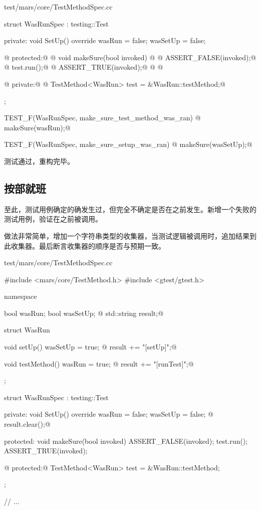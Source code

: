 \begin{content}
\begin{nodiff}{test/mars/core/TestMethodSpec.cc}
\begin{c++}
{  struct WasRunSpec : testing::Test {
  private:
    void SetUp() override {
      wasRun = false;
      wasSetUp = false;
    }

@  protected:@
@    void makeSure(bool invoked) {@
@      ASSERT_FALSE(invoked);@
@      test.run();@
@      ASSERT_TRUE(invoked);@      
@    }@

@  private:@
@    TestMethod<WasRun> test = &WasRun::testMethod;@
  };
}

TEST_F(WasRunSpec, make_sure_test_method_was_ran) {
@  makeSure(wasRun);@
}

TEST_F(WasRunSpec, make_sure_setup_was_ran) {
@  makeSure(wasSetUp);@
}
\end{c++}
\end{nodiff}

测试通过，重构完毕。

\subsection{按部就班}

至此，测试用例确定的确发生过，但完全不确定是否在之前发生。新增一个失败的测试用例，验证在之前被调用。

做法非常简单，增加一个字符串类型的收集器，当测试逻辑被调用时，追加结果到此收集器。最后断言收集器的顺序是否与预期一致。

\begin{nodiff}{test/mars/core/TestMethodSpec.cc}
\begin{c++}
#include <mars/core/TestMethod.h>
#include <gtest/gtest.h>

namespace {
  bool wasRun;
  bool wasSetUp;
@  std::string result;@

  struct WasRun {
    void setUp() {
      wasSetUp = true;
@      result += "[setUp]";@
    }

    void testMethod() {
      wasRun = true;
@      result += "[runTest]";@
    }
  };

  struct WasRunSpec : testing::Test {
  private:
    void SetUp() override {
      wasRun = false;
      wasSetUp = false;
@      result.clear();@
    }

  protected:
    void makeSure(bool invoked) {
      ASSERT_FALSE(invoked);
      test.run();
      ASSERT_TRUE(invoked);      
    }

@  protected:@
    TestMethod<WasRun> test = &WasRun::testMethod;
  };
}

// ...


\end{c++}
\end{nodiff}
\end{content}
